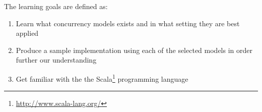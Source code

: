 The learning goals are defined as:
\begin{enumerate}
\item Learn what concurrency models exists and in what setting they are best applied
\item Produce a sample implementation using each of the selected models in order further our understanding
\item Get familiar with the the Scala\footnote{\url{http://www.scala-lang.org/}} programming language
\end{enumerate}

\worksheetend